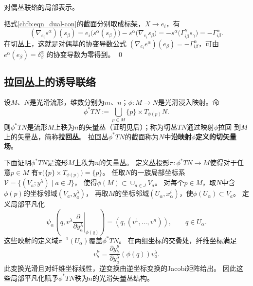 \begin{example}
    对偶丛联络的局部表示。
\end{example}
把式\eqref{chfb:eqn_dual-con}的截面分别取成标架，$X\to {e_i}$，有
\begin{equation}
    (\nabla_{e_i} s^{\alpha} )(s_\beta)= {e_i} \bigl(s^{\alpha}(s_\beta)\bigr)
    -s^{\alpha} \bigl(\nabla_{e_i} s_\beta\bigr)
    =-s^{\alpha} \bigl( \Gamma^\gamma_{i \beta} s_\gamma \bigr)
    =-\Gamma^\alpha_{i \beta} .
\end{equation}
在切丛上，这就是对偶基的协变导数公式 $(\nabla_{e_i}e^\alpha)(e_\beta)=-\Gamma^\alpha_{i\beta}$，可由 $e^\alpha(e_\beta)=\delta^\alpha_\beta$ 的协变导数为零得到。
\qed

\subsection{拉回丛上的诱导联络}

设$M$、$N$是光滑流形，维数分别为$m$、$n$；$\phi:M\to N$是光滑浸入映射。命
\begin{equation}
    \phi^* TN := \bigcup_{p \in M} \{p\}\times T_{\phi(p)} N .
\end{equation}
则$\phi^* TN$是流形$M$上秩为$n$的矢量丛（证明见后）；称为切丛$TN$通过映射$\phi$拉回
到$M$上的矢量丛，简称\textbf{拉回丛}。
拉回丛$\phi^* TN$的截面称为$N$中\textbf{沿映射$\phi$定义的切矢量场}。

下面证明$\phi^* TN$是流形$M$上秩为$n$的矢量丛。
定义丛投影$\pi : \phi^* TN \to M$使得对于任意$p\in M$
有$\pi\bigl(\{p\}\times T_{\phi(p)} \bigr)=\{p\} $。
任取$N$的一族局部坐标系$\mathcal{V}=\{(V_a; y^\lambda)\mid a \in J\}$，
使得$\phi(M)\subset \cup_{a\in J} V_a$。
对每个$p\in M$，取$N$中含$\phi(p)$的坐标邻域$(V_a,y_a^\lambda)$，
再取$M$的坐标邻域$(U_\alpha,x_\alpha^i)$，使$\phi(U_\alpha)\subset V_a$。
定义局部平凡化
\[
 \psi_\alpha\left(q,v^\lambda
 \left.\frac{\partial}{\partial y_a^\lambda}\right|_{\phi(q)}\right)
 =(q,(v^1,\ldots,v^n)),\qquad q\in U_\alpha .
\]
这些映射的定义域$\pi^{-1}(U_\alpha)$覆盖$\phi^*TN$。
在两组坐标的交叠处，纤维坐标满足
\[
 v_b^\mu=\frac{\partial y_b^\mu}{\partial y_a^\lambda}(\phi(q))v_a^\lambda .
\]
此变换光滑且对纤维坐标线性，逆变换由逆坐标变换的Jacobi矩阵给出。
因此这些局部平凡化赋予$\phi^*TN$秩为$n$的光滑矢量丛结构。

